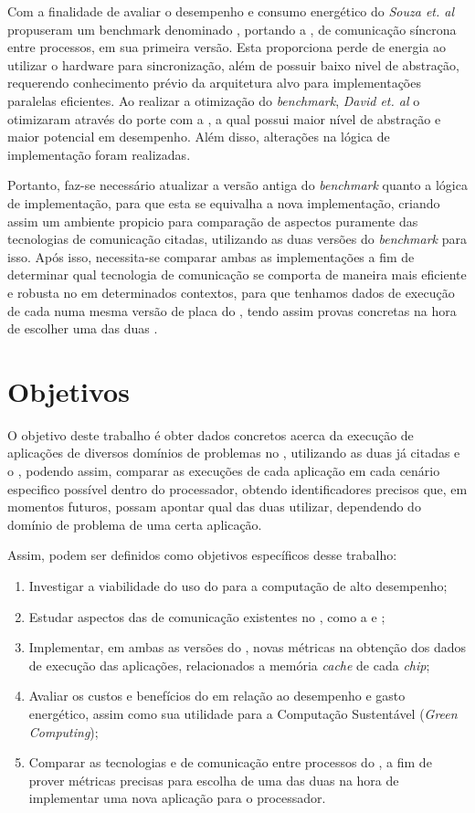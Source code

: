 \documentclass[
    12pt,               %
    openright,          %
    twoside,            %
    a4paper,            %
    english,            %
    brazil,             %
    ]{abntex2}
\begin{document}
Com a finalidade de avaliar o desempenho e consumo energético do \mppa \textit{Souza et. al} propuseram um benchmark denominado \capbmarks, portando a \api \ipc \cite{MPPA-2:2013}, de comunicação síncrona entre processos, em sua primeira versão. Esta \api proporciona perde de energia ao utilizar o hardware para sincronização, além de possuir baixo nivel de abstração, requerendo conhecimento prévio da arquitetura alvo para implementações paralelas eficientes. Ao realizar a otimização do \textit{benchmark}, \textit{David et. al} o otimizaram através do porte com a \api \async, a qual possui maior nível de abstração e maior potencial em desempenho. Além disso, alterações na lógica de implementação foram realizadas.

Portanto, faz-se necessário atualizar a versão antiga do \textit{benchmark} quanto a lógica de implementação, para que esta se equivalha a nova implementação, criando assim um ambiente propicio para comparação de aspectos puramente das tecnologias de comunicação citadas, utilizando as duas versões do \textit{benchmark} para isso. Após isso, necessita-se comparar ambas as implementações a fim de determinar qual tecnologia de comunicação se comporta de maneira mais eficiente e robusta no \mppa em determinados contextos, para que tenhamos dados de execução de cada \api numa mesma versão de placa do \mppa, tendo assim provas concretas na hora de escolher uma das duas \apis.

\chapter{Objetivos}
\label{cap:objetivos}

O objetivo deste trabalho é obter dados concretos acerca da execução de aplicações de diversos domínios de problemas no \mppa, utilizando as duas \apis já citadas e o \capb, podendo assim, comparar as execuções de cada aplicação em cada cenário especifico possível dentro do processador, obtendo identificadores precisos que, em momentos futuros, possam apontar qual das duas \apis utilizar, dependendo do domínio de problema de uma certa aplicação.

Assim, podem ser definidos como objetivos específicos desse trabalho:
\begin{enumerate}
    \item Investigar a viabilidade do uso do \mppa para a computação de alto desempenho;
    \item Estudar aspectos das \apis de comunicação existentes no \mppa, como a \async e \ipc;
    \item Implementar, em ambas as versões do \capb, novas métricas na obtenção dos dados de execução das aplicações, relacionados a memória \textit{cache} de cada \textit{chip};
    \item Avaliar os custos e benefícios do \mppa em relação ao desempenho e gasto energético, assim como sua utilidade para a Computação Sustentável (\textit{Green Computing});
    \item Comparar as tecnologias \async e \ipc de comunicação entre processos do \mppa, a fim de prover métricas precisas para escolha de uma das duas na hora de implementar uma nova aplicação para o processador.
\end{enumerate}
\end{document}
